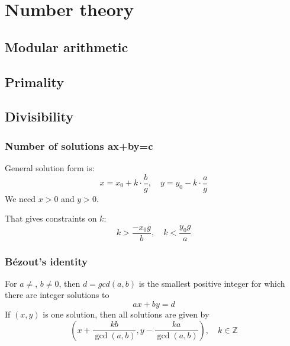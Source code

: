 \chapter{Number theory}

\section{Modular arithmetic}


\section{Primality}

\section{Divisibility}

	\subsection{Number of solutions ax+by=c}
	General solution form is:
	$$
	x = x_0 + k \cdot \frac{b}{g}, \quad y = y_0 - k \cdot \frac{a}{g}
	$$
	We need $x > 0$ and $y > 0$.

	That gives constraints on $k$:
	$$k > \frac{-x_0 g}{b}, \quad k < \frac{y_0 g}{a}$$

	\subsection{Bézout's identity}
	For $a \neq $, $b \neq 0$, then $d=gcd(a,b)$ is the smallest positive integer for which there are integer solutions to
	$$ax+by=d$$
	If $(x,y)$ is one solution, then all solutions are given by
	$$\left(x+\frac{kb}{\gcd(a,b)}, y-\frac{ka}{\gcd(a,b)}\right), \quad k\in\mathbb{Z}$$


